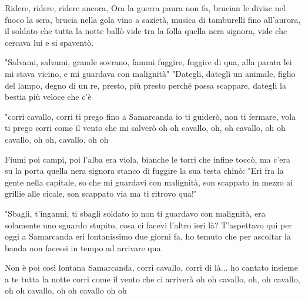 
\beginverse

Ridere, ridere, ridere ancora,
Ora la guerra paura non fa,
brucian le divise nel fuoco la sera,
brucia nella gola vino a sazietà,
musica di tamburelli fino all'aurora,
il soldato che tutta la notte ballò
vide tra la folla quella nera signora,
vide che cercava lui e si spaventò. 

\endverse

\chordsoff

\beginverse

"Salvami, salvami, grande sovrano, fammi fuggire, fuggire di qua,
alla parata lei mi stava vicino,
e mi guardava con malignità"
"Dategli, dategli un animale,
figlio del lampo, degno di un re,
presto, più presto perché possa scappare,
dategli la bestia più veloce che c'è 

\endverse

\chordson

\beginchorus

"corri cavallo, corri ti prego
fino a Samarcanda io ti guiderò,
non ti fermare, vola ti prego
corri come il vento che mi salverò
oh oh cavallo, oh, oh cavallo, oh oh cavallo, 
oh oh, cavallo, oh oh

\endchorus

\chordsoff

\beginverse

Fiumi poi campi, poi l'alba era viola,
bianche le torri che infine toccò,
ma c'era su la porta quella nera signora
stanco di fuggire la sua testa chinò:
"Eri fra la gente nella capitale,
so che mi guardavi con malignità, son scappato in mezzo ai grillie alle cicale,
son scappato via ma ti ritrovo qua!" 

\endverse

\beginverse

"Sbagli, t'inganni, ti sbagli soldato
io non ti guardavo con malignità,
era solamente uno sguardo stupito,
cosa ci facevi l'altro ieri là?
T'aspettavo qui per oggi a Samarcanda
eri lontanissimo due giorni fa,
ho temuto che per ascoltar la banda
non facessi in tempo ad arrivare qua

\endverse

\beginchorus

Non è poi così lontana Samarcanda,
corri cavallo, corri di là...
ho cantato insieme a te tutta la notte
corri come il vento che ci arriverà
oh oh cavallo, oh, oh cavallo, oh oh cavallo, oh oh cavallo oh oh 

\endchorus

\endsong


